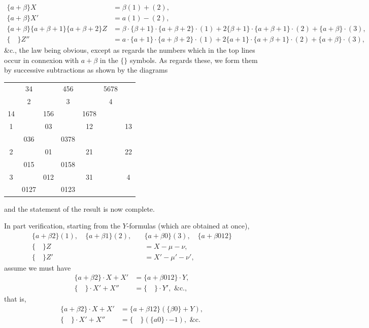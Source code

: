 \documentclass[12pt,a4paper]{article}
\theoremstyle{cayley}
\theoremstyle{definition}
\numberwithin{equation}{section}
\begin{document}
\begin{align*}
\{a + \beta\}X &= \beta(1) + (2), \\
\{a + \beta\}X' &= a(1) - (2), \\
\{a + \beta\}\{a + \beta + 1\}\{a + \beta + 2\}Z &= \beta \cdot \{\beta + 1\} \cdot \{a + \beta + 2\} \cdot (1) + 2\{\beta + 1\} \cdot \{a + \beta + 1\} \cdot (2) + \{a + \beta\} \cdot (3), \\
\{ \quad \}Z'' &= a \cdot \{a + 1\} \cdot \{a + \beta + 2\} \cdot (1) + 2\{a + 1\} \cdot \{a + \beta + 1\} \cdot (2) + \{a + \beta\} \cdot (3),
\end{align*}
\&c., the law being obvious, except as regards the numbers which in the top lines occur in connexion with $a + \beta$ in the $\{\}$ symbols. As regards these, we form them by successive subtractions as shown by the diagrams
\begin{center}
\begin{tabular}{ccccccc}
 & 34 & & 456 & & 5678 \\
 & 2 & & 3 & & 4 \\
14 & & 156 & & 1678 \\
1 & & 03 & & 12 & & 13 \\
 & 036 & & 0378 \\
2 & & 01 & & 21 & & 22 \\
 & 015 & & 0158 \\
3 & & 012 & & 31 & & 4 \\
 & 0127 & & 0123
\end{tabular}
\end{center}
and the statement of the result is now complete.

In part verification, starting from the $Y$-formulas (which are obtained at once),
\begin{align*}
\{a + \beta 2\}(1), \quad \{a + \beta 1\}(2), \quad &\{a + \beta 0\}(3), \quad \{a + \beta 012\} \\
\{ \quad \}Z &= X - \mu - \nu, \\
\{ \quad \}Z' &= X' - \mu' - \nu',
\end{align*}
assume we must have
\begin{align*}
\{a + \beta 2\} \cdot X + X' &= \{a + \beta 012\} \cdot Y, \\
\{ \quad \} \cdot X' + X'' &= \{ \quad \} \cdot Y', \text{ \&c.},
\end{align*}
that is,
\begin{align*}
\{a + \beta 2\} \cdot X + X' &= \{a + \beta 12\} (\{\beta 0\} + Y), \\
\{ \quad \} \cdot X' + X'' &= \{ \quad \} (\{a0\} \cdot -1), \text{ \&c.}
\end{align*}
\end{document}
